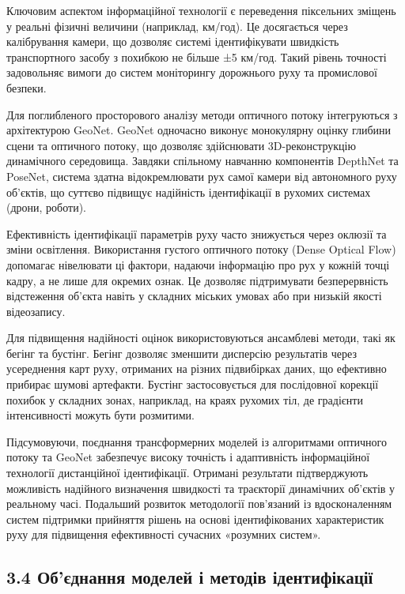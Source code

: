 \documentclass[
]{article}
\begin{document}
Ключовим аспектом інформаційної технології є переведення піксельних зміщень у реальні фізичні величини (наприклад, км/год). Це досягається через калібрування камери, що дозволяє системі ідентифікувати швидкість транспортного засобу з похибкою не більше ±5 км/год. Такий рівень точності задовольняє вимоги до систем моніторингу дорожнього руху та промислової безпеки.

Для поглибленого просторового аналізу методи оптичного потоку інтегруються з архітектурою GeoNet. GeoNet одночасно виконує монокулярну оцінку глибини сцени та оптичного потоку, що дозволяє здійснювати 3D-реконструкцію динамічного середовища. Завдяки спільному навчанню компонентів DepthNet та PoseNet, система здатна відокремлювати рух самої камери від автономного руху об'єктів, що суттєво підвищує надійність ідентифікації в рухомих системах (дрони, роботи).

Ефективність ідентифікації параметрів руху часто знижується через оклюзії та зміни освітлення. Використання густого оптичного потоку (Dense Optical Flow) допомагає нівелювати ці фактори, надаючи інформацію про рух у кожній точці кадру, а не лише для окремих ознак. Це дозволяє підтримувати безперервність відстеження об'єкта навіть у складних міських умовах або при низькій якості відеозапису.

Для підвищення надійності оцінок використовуються ансамблеві методи, такі як бегінг та бустінг. Бегінг дозволяє зменшити дисперсію результатів через усереднення карт руху, отриманих на різних підвибірках даних, що ефективно прибирає шумові артефакти. Бустінг застосовується для послідовної корекції похибок у складних зонах, наприклад, на краях рухомих тіл, де градієнти інтенсивності можуть бути розмитими.

Підсумовуючи, поєднання трансформерних моделей із алгоритмами оптичного потоку та GeoNet забезпечує високу точність і адаптивність інформаційної технології дистанційної ідентифікації. Отримані результати підтверджують можливість надійного визначення швидкості та траєкторії динамічних об'єктів у реальному часі. Подальший розвиток методології пов'язаний із вдосконаленням систем підтримки прийняття рішень на основі ідентифікованих характеристик руху для підвищення ефективності сучасних «розумних систем».

\subsection{3.4 Об'єднання моделей і методів ідентифікації}\label{ux43eux431ux454ux434ux43dux430ux43dux43dux44f-ux43cux43eux434ux435ux43bux435ux439-ux456-ux43cux435ux442ux43eux434ux456ux432-ux456ux434ux435ux43dux442ux438ux444ux456ux43aux430ux446ux456ux457}
\end{document}
